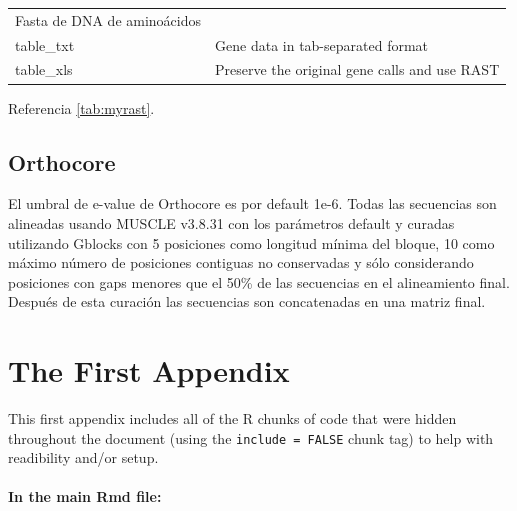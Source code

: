 \documentclass[12pt,twoside]{reedthesis}
\begin{document}
\begin{longtable}[]{@{}ll@{}}
\begin{minipage}[t]{0.72\columnwidth}
  Fasta de DNA de aminoácidos\strut
  \end{minipage}\tabularnewline
  \begin{minipage}[t]{0.22\columnwidth}\raggedright\strut
  table\_txt\strut
  \end{minipage} & \begin{minipage}[t]{0.72\columnwidth}\raggedright\strut
  Gene data in tab-separated format\strut
  \end{minipage}\tabularnewline
  \begin{minipage}[t]{0.22\columnwidth}\raggedright\strut
  table\_xls\strut
  \end{minipage} & \begin{minipage}[t]{0.72\columnwidth}\raggedright\strut
  Preserve the original gene calls and use RAST\strut
  \end{minipage}\tabularnewline
  \bottomrule
  \end{longtable}
  
  Referencia \autoref{tab:myrast}.
  
  \section{Orthocore}\label{orthocore}
  
  El umbral de e-value de Orthocore es por default 1e-6. Todas las
  secuencias son alineadas usando MUSCLE v3.8.31 con los parámetros
  default y curadas utilizando Gblocks con 5 posiciones como longitud
  mínima del bloque, 10 como máximo número de posiciones contiguas no
  conservadas y sólo considerando posiciones con gaps menores que el 50\%
  de las secuencias en el alineamiento final. Después de esta curación las
  secuencias son concatenadas en una matriz final.
  
  \appendix
  
  \chapter{The First Appendix}\label{the-first-appendix}
  
  This first appendix includes all of the R chunks of code that were
  hidden throughout the document (using the \texttt{include\ =\ FALSE}
  chunk tag) to help with readibility and/or setup.
  
  \subsubsection{In the main Rmd file:}\label{in-the-main-rmd-file}
  
\end{document}

